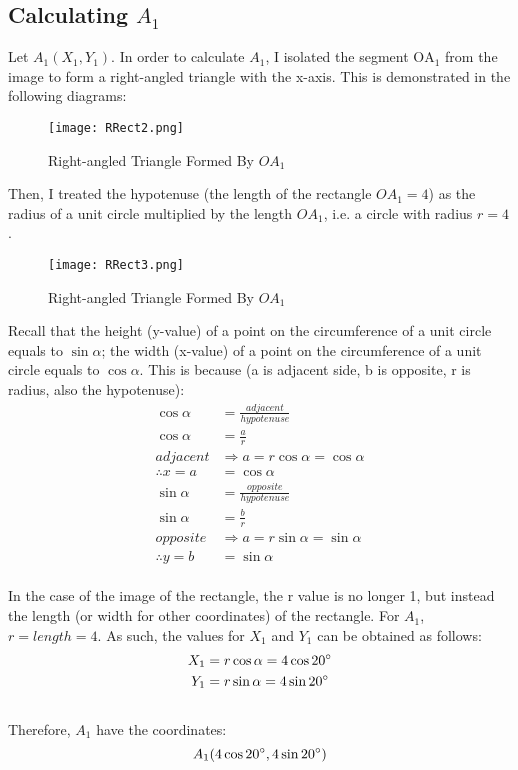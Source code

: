 \documentclass{article}
\begin{document}
        \subsection{Calculating $A_1$} Let $A_1(X_1, Y_1)$. In order to calculate $A_1$, I isolated the segment $\mathrm{OA_1}$ from the image to form a right-angled triangle with the x-axis. This is demonstrated in the following diagrams:
        \begin{figure}[h!]
            \texttt{[image: RRect2.png]}
            \caption{Right-angled Triangle Formed By $OA_1$}
            \label{fig:rrect2}
        \end{figure} \newline
        Then, I treated the hypotenuse (the length of the rectangle $OA_1 = 4$) as the radius of a unit circle multiplied by the length $OA_1$, i.e. a circle with radius $r = 4$. \newpage
        \begin{figure}[h!]
            \texttt{[image: RRect3.png]}
            \caption{Right-angled Triangle Formed By $OA_1$}
            \label{fig:rrect3}
        \end{figure} 
        Recall that the height (y-value) of a point on the circumference of a unit circle equals to $\sin{\alpha}$; the width (x-value) of a point on the circumference of a unit circle equals to $\cos{\alpha}$. This is because (a is adjacent side, b is opposite, r is radius, also the hypotenuse):
        \begin{align*}
            \cos{\alpha} &= \frac{adjacent}{hypotenuse} \\
            \cos{\alpha} &= \frac{a}{r} \\
            adjacent &\Rightarrow a = r\cos{\alpha} = \cos{\alpha} \\
            \therefore x = a &= \cos{\alpha} \\
            \sin{\alpha} &= \frac{opposite}{hypotenuse} \\
            \sin{\alpha} &= \frac{b}{r} \\
            opposite &\Rightarrow a = r\sin{\alpha} = \sin{\alpha} \\
            \therefore y = b &= \sin{\alpha}
        \end{align*} \\
        In the case of the image of the rectangle, the r value is no longer 1, but instead the length (or width for other coordinates) of the rectangle. For $A_1$, $r = length = 4$. As such, the values for $X_1$ and $Y_1$ can be obtained as follows:
        \begin{align*}
            X_1 &= r\cos{\alpha} = 4\cos{20\degree} \\
            Y_1 &= r\sin{\alpha} = 4\sin{20\degree}
        \end{align*} \\
        Therefore, $A_1$ have the coordinates:
        \begin{equation}
            A_1(4\cos{20\degree}, 4\sin{20\degree})
        \end{equation}
\end{document}
